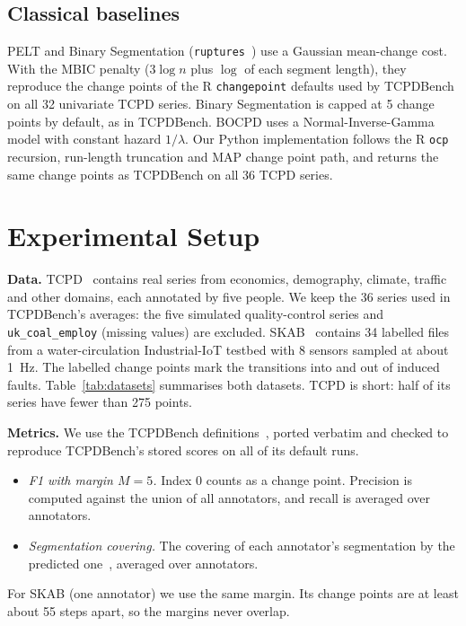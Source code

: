\documentclass[conference]{IEEEtran}
\begin{document}
\subsection{Classical baselines}
PELT and Binary Segmentation (\texttt{ruptures}~\cite{truong2020ruptures}) use a Gaussian mean-change cost. With the MBIC penalty ($3\log n$ plus $\log$ of each segment length), they reproduce the change points of the R \texttt{changepoint} defaults used by TCPDBench on all 32 univariate TCPD series. Binary Segmentation is capped at 5 change points by default, as in TCPDBench. BOCPD uses a Normal-Inverse-Gamma model with constant hazard $1/\lambda$. Our Python implementation follows the R \texttt{ocp} recursion, run-length truncation and MAP change point path, and returns the same change points as TCPDBench on all 36 TCPD series.

\section{Experimental Setup}
\textbf{Data.} TCPD~\cite{vandenburg2020evaluation} contains real series from economics, demography, climate, traffic and other domains, each annotated by five people. We keep the 36 series used in TCPDBench's averages: the five simulated quality-control series and \texttt{uk\_coal\_employ} (missing values) are excluded. SKAB~\cite{skab} contains 34 labelled files from a water-circulation Industrial-IoT testbed with 8 sensors sampled at about 1~Hz. The labelled change points mark the transitions into and out of induced faults. Table~\ref{tab:datasets} summarises both datasets. TCPD is short: half of its series have fewer than 275 points.



\textbf{Metrics.} We use the TCPDBench definitions~\cite{vandenburg2020evaluation}, ported verbatim and checked to reproduce TCPDBench's stored scores on all of its default runs.
\begin{itemize}
\item \emph{F1 with margin $M=5$.} Index 0 counts as a change point. Precision is computed against the union of all annotators, and recall is averaged over annotators.
\item \emph{Segmentation covering.} The covering of each annotator's segmentation by the predicted one~\cite{arbelaez2011contour}, averaged over annotators.
\end{itemize}
For SKAB (one annotator) we use the same margin. Its change points are at least about 55 steps apart, so the margins never overlap.
\end{document}
